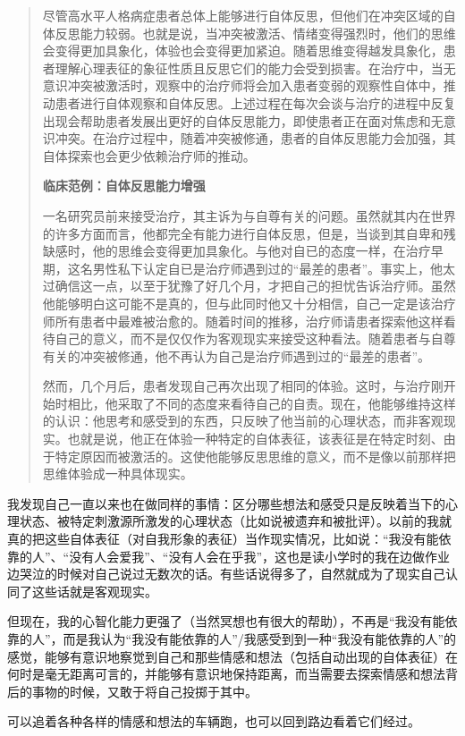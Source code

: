 \blockquote{
	尽管高水平人格病症患者总体上能够进行自体反思，但他们在冲突区域的自体反思能力较弱。也就是说，当冲突被激活、情绪变得强烈时，他们的思维会变得更加具象化，体验也会变得更加紧迫。随着思维变得越发具象化，患者理解心理表征的象征性质且反思它们的能力会受到损害。在治疗中，当无意识冲突被激活时，观察中的治疗师将会加入患者变弱的观察性自体中，推动患者进行自体观察和自体反思。上述过程在每次会谈与治疗的进程中反复出现会帮助患者发展出更好的自体反思能力，即使患者正在面对焦虑和无意识冲突。在治疗过程中，随着冲突被修通，患者的自体反思能力会加强，其自体探索也会更少依赖治疗师的推动。

	\textbf{临床范例：自体反思能力增强}

	一名研究员前来接受治疗，其主诉为与自尊有关的问题。虽然就其内在世界的许多方面而言，他都完全有能力进行自体反思，但是，当谈到其自卑和残缺感时，他的思维会变得更加具象化。与他对自已的态度一样，在治疗早期，这名男性私下认定自已是治疗师遇到过的“最差的患者”。事实上，他太过确信这一点，以至于犹豫了好几个月，才把自己的担忧告诉治疗师。虽然他能够明白这可能不是真的，但与此同时他又十分相信，自己一定是该治疗师所有患者中最难被治愈的。随着时间的推移，治疗师请患者探索他这样看待自己的意义，而不是仅仅作为客观现实来接受这种看法。随着患者与自尊有关的冲突被修通，他不再认为自己是治疗师遇到过的“最差的患者”。

	然而，几个月后，患者发现自己再次出现了相同的体验。这时，与治疗刚开始时相比，他采取了不同的态度来看待自己的自责。现在，他能够维持这样的认识：他思考和感受到的东西，只反映了他当前的心理状态，而非客观现实。也就是说，他正在体验一种特定的自体表征，该表征是在特定时刻、由于特定原因而被激活的。这使他能够反思思维的意义，而不是像以前那样把思维体验成一种具体现实。

}

我发现自己一直以来也在做同样的事情：区分哪些想法和感受只是反映着当下的心理状态、被特定刺激源所激发的心理状态（比如说被遗弃和被批评）。以前的我就真的把这些自体表征（对自我形象的表征）当作现实情况，比如说：“我没有能依靠的人”、“没有人会爱我”、“没有人会在乎我”，这也是读小学时的我在边做作业边哭泣的时候对自己说过无数次的话。有些话说得多了，自然就成为了现实\pozhehao{}自己认同了这些话就是客观现实。

但现在，我的心智化能力更强了（当然冥想也有很大的帮助），不再是“我没有能依靠的人”，而是我认为“我没有能依靠的人”/我感受到到一种“我没有能依靠的人”的感觉，能够有意识地察觉到自己和那些情感和想法（包括自动出现的自体表征）在何时是毫无距离可言的，并能够有意识地保持距离，而当需要去探索情感和想法背后的事物的时候，又敢于将自己投掷于其中。

可以追着各种各样的情感和想法的车辆跑，也可以回到路边看着它们经过。

